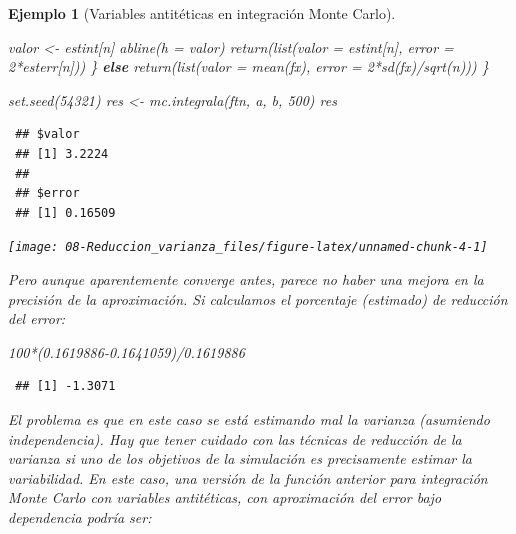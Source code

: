 \documentclass[
  10pt,
]{book}
\newenvironment{Shaded}{\begin{snugshade}}{\end{snugshade}}
\newcommand{\AttributeTok}[1]{\textcolor[rgb]{0.77,0.63,0.00}{#1}}
\newcommand{\ControlFlowTok}[1]{\textcolor[rgb]{0.13,0.29,0.53}{\textbf{#1}}}
\newcommand{\DecValTok}[1]{\textcolor[rgb]{0.00,0.00,0.81}{#1}}
\newcommand{\FloatTok}[1]{\textcolor[rgb]{0.00,0.00,0.81}{#1}}
\newcommand{\FunctionTok}[1]{\textcolor[rgb]{0.00,0.00,0.00}{#1}}
\newcommand{\NormalTok}[1]{#1}
\newcommand{\OtherTok}[1]{\textcolor[rgb]{0.56,0.35,0.01}{#1}}
\newcommand{\SpecialCharTok}[1]{\textcolor[rgb]{0.00,0.00,0.00}{#1}}
\theoremstyle{break}
\newtheorem{example}{Ejemplo}[chapter]
\theoremstyle{nonumberplain}
\begin{document}
\begin{example}[Variables antitéticas en integración Monte Carlo]
\begin{Shaded}
\begin{Highlighting}[]
\NormalTok{    valor }\OtherTok{\textless{}{-}}\NormalTok{ estint[n]}
    \FunctionTok{abline}\NormalTok{(}\AttributeTok{h =}\NormalTok{ valor)}
    \FunctionTok{return}\NormalTok{(}\FunctionTok{list}\NormalTok{(}\AttributeTok{valor =}\NormalTok{ estint[n], }\AttributeTok{error =} \DecValTok{2}\SpecialCharTok{*}\NormalTok{esterr[n]))}
\NormalTok{  \} }\ControlFlowTok{else} \FunctionTok{return}\NormalTok{(}\FunctionTok{list}\NormalTok{(}\AttributeTok{valor =} \FunctionTok{mean}\NormalTok{(fx), }\AttributeTok{error =} \DecValTok{2}\SpecialCharTok{*}\FunctionTok{sd}\NormalTok{(fx)}\SpecialCharTok{/}\FunctionTok{sqrt}\NormalTok{(n)))}
\NormalTok{\}}

\FunctionTok{set.seed}\NormalTok{(}\DecValTok{54321}\NormalTok{)}
\NormalTok{res }\OtherTok{\textless{}{-}} \FunctionTok{mc.integrala}\NormalTok{(ftn, a, b, }\DecValTok{500}\NormalTok{)}
\NormalTok{res}
\end{Highlighting}
\end{Shaded}

\begin{verbatim}
 ## $valor
 ## [1] 3.2224
 ## 
 ## $error
 ## [1] 0.16509
\end{verbatim}

\begin{center}\texttt{[image: 08-Reduccion\_varianza\_files/figure-latex/unnamed-chunk-4-1]} \end{center}

Pero aunque aparentemente converge antes, parece no haber una mejora en la precisión de la aproximación.
Si calculamos el porcentaje (estimado) de reducción del error:

\begin{Shaded}
\begin{Highlighting}[]
\DecValTok{100}\SpecialCharTok{*}\NormalTok{(}\FloatTok{0.1619886{-}0.1641059}\NormalTok{)}\SpecialCharTok{/}\FloatTok{0.1619886}
\end{Highlighting}
\end{Shaded}

\begin{verbatim}
 ## [1] -1.3071
\end{verbatim}

El problema es que en este caso se está estimando mal la varianza (asumiendo independencia).
Hay que tener cuidado con las técnicas de reducción de la varianza si uno de los objetivos de la simulación es precisamente estimar la variabilidad.
En este caso, una versión de la función anterior para integración Monte Carlo con variables antitéticas, con aproximación del error bajo dependencia podría ser:


\end{example}
\end{document}
